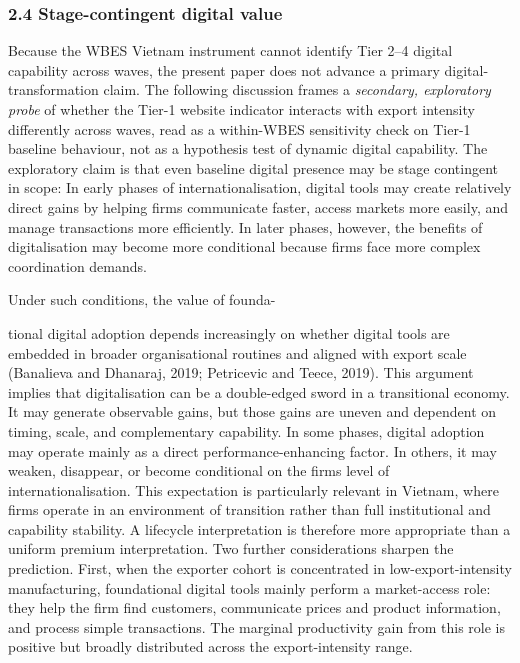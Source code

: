 \documentclass[12pt,a4paper]{article}
\begin{document}
\hypertarget{24-stage-contingent-digital-value}{%
\subsubsection{2.4 Stage-contingent digital
value}\label{24-stage-contingent-digital-value}}

Because the WBES Vietnam instrument cannot identify Tier 2--4 digital
capability across waves, the present paper does not advance a primary
digital-transformation claim. The following discussion frames a
\emph{secondary, exploratory probe} of whether the Tier-1 website
indicator interacts with export intensity differently across waves, read
as a within-WBES sensitivity check on Tier-1 baseline behaviour, not as
a hypothesis test of dynamic digital capability. The exploratory claim
is that even baseline digital presence may be stage contingent in scope:
In early phases of internationalisation, digital tools may create
relatively direct gains by helping firms communicate faster, access
markets more easily, and manage transactions more efficiently. In later
phases, however, the benefits of digitalisation may become more
conditional because firms face more complex coordination demands.

Under such conditions, the value of founda-

tional digital adoption depends increasingly on whether digital tools
are embedded in broader organisational routines and aligned with export
scale (Banalieva and Dhanaraj, 2019; Petricevic and Teece, 2019). This
argument implies that digitalisation can be a double-edged sword in a
transitional economy. It may generate observable gains, but those gains
are uneven and dependent on timing, scale, and complementary capability.
In some phases, digital adoption may operate mainly as a direct
performance-enhancing factor. In others, it may weaken, disappear, or
become conditional on the firm\textquotesingle s level of
internationalisation. This expectation is particularly relevant in
Vietnam, where firms operate in an environment of transition rather than
full institutional and capability stability. A lifecycle interpretation
is therefore more appropriate than a uniform premium interpretation. Two
further considerations sharpen the prediction. First, when the exporter
cohort is concentrated in low-export-intensity manufacturing,
foundational digital tools mainly perform a market-access role: they
help the firm find customers, communicate prices and product
information, and process simple transactions. The marginal productivity
gain from this role is positive but broadly distributed across the
export-intensity range.
\end{document}
